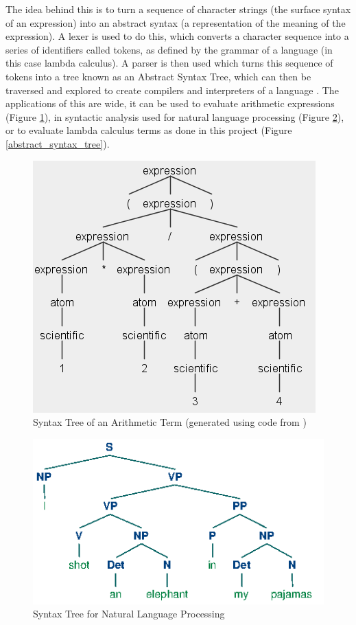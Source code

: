 \documentclass[a4paper,11pt]{report}
\begin{document}
The idea behind this is to turn a sequence of character strings (the surface syntax of an expression) into an abstract syntax (a representation of the meaning of the expression). A lexer is used to do this, which converts a character sequence into a series of identifiers called tokens, as defined by the grammar of a language (in this case lambda calculus). A parser is then used which turns this sequence of tokens into a tree known as an Abstract Syntax Tree, which can then be traversed and explored to create compilers and interpreters of a language \cite{Pierce2002}. The applications of this are wide, it can be used to evaluate arithmetic expressions (Figure \ref{arithmetic_syntax_tree}), in syntactic analysis used for natural language processing \cite{Bird2009} (Figure \ref{nlp_tree}), or to evaluate lambda calculus terms as done in this project (Figure \ref{abstract_syntax_tree}).

\begin{figure}[p]
	\centering
	\includegraphics[scale=0.75]{images/arithmetic_syntax_tree}
	\caption{Syntax Tree of an Arithmetic Term (generated using code from \protect\cite{Everett2019})}
	\label{arithmetic_syntax_tree}
\end{figure}

\begin{figure}[p]
	\centering
	\includegraphics[scale=0.75]{images/nlp_tree}
	\caption{Syntax Tree for Natural Language Processing \protect\cite{Bird2009}}
	\label{nlp_tree}
\end{figure}
\end{document}
